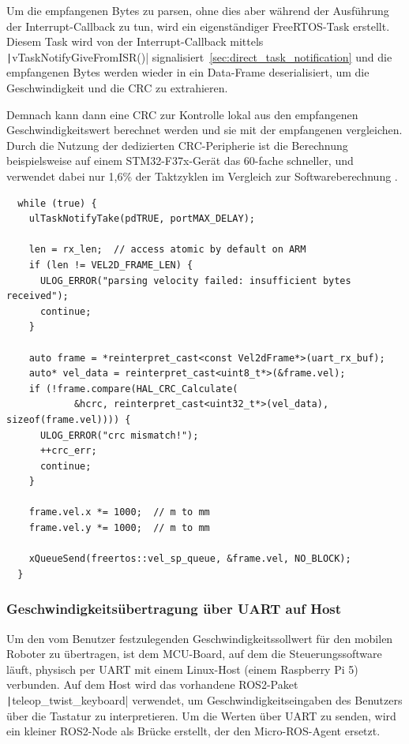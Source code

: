 Um die empfangenen Bytes zu parsen, ohne dies aber während der Ausführung der
Interrupt-Callback zu tun, wird ein eigenständiger FreeRTOS-Task erstellt.
Diesem Task wird von der Interrupt-Callback mittels
\texttt|vTaskNotifyGiveFromISR()|
signalisiert~\ref{sec:direct_task_notification} und die empfangenen Bytes werden
wieder in ein Data-Frame deserialisiert, um die Geschwindigkeit und die CRC zu
extrahieren.

Demnach kann dann eine CRC zur Kontrolle lokal aus den empfangenen
Geschwindigkeitswert berechnet werden und sie mit der empfangenen vergleichen.
Durch die Nutzung der dedizierten CRC-Peripherie ist die Berechnung
beispielsweise auf einem STM32-F37x-Gerät das 60-fache schneller, und verwendet
dabei nur 1,6\% der Taktzyklen im Vergleich zur Softwareberechnung \cite[S.
9]{AN4187}.

\begin{code}
\begin{verbatim}
  while (true) {
    ulTaskNotifyTake(pdTRUE, portMAX_DELAY);

    len = rx_len;  // access atomic by default on ARM
    if (len != VEL2D_FRAME_LEN) {
      ULOG_ERROR("parsing velocity failed: insufficient bytes received");
      continue;
    }

    auto frame = *reinterpret_cast<const Vel2dFrame*>(uart_rx_buf);
    auto* vel_data = reinterpret_cast<uint8_t*>(&frame.vel);
    if (!frame.compare(HAL_CRC_Calculate(
            &hcrc, reinterpret_cast<uint32_t*>(vel_data), sizeof(frame.vel)))) {
      ULOG_ERROR("crc mismatch!");
      ++crc_err;
      continue;
    }

    frame.vel.x *= 1000;  // m to mm
    frame.vel.y *= 1000;  // m to mm

    xQueueSend(freertos::vel_sp_queue, &frame.vel, NO_BLOCK);
  }
\end{verbatim}
\end{code}

\subsubsection{Geschwindigkeitsübertragung über UART auf Host}

Um den vom Benutzer festzulegenden Geschwindigkeitssollwert für den mobilen
Roboter zu übertragen, ist dem MCU-Board, auf dem die Steuerungssoftware läuft,
physisch per UART mit einem Linux-Host (einem Raspberry Pi 5) verbunden. Auf dem
Host wird das vorhandene ROS2-Paket \texttt|teleop_twist_keyboard|
verwendet, um Geschwindigkeitseingaben des Benutzers über die Tastatur zu
interpretieren. Um die Werten über UART zu senden, wird ein kleiner ROS2-Node
als Brücke erstellt, der den Micro-ROS-Agent ersetzt.


